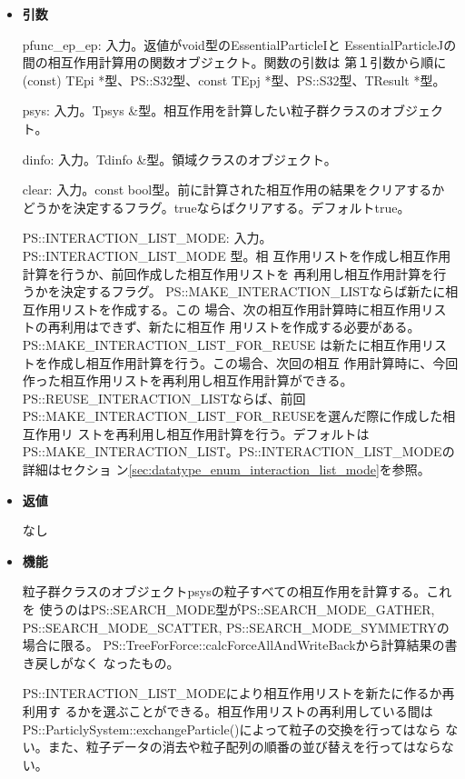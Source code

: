\begin{itemize}

\item {\bf 引数}

pfunc\_ep\_ep: 入力。返値がvoid型のEssentialParticleIと
EssentialParticleJの間の相互作用計算用の関数オブジェクト。関数の引数は
第１引数から順に(const) TEpi *型、PS::S32型、const
TEpj *型、PS::S32型、TResult *型。

psys: 入力。Tpsys \&型。相互作用を計算したい粒子群クラスのオブジェクト。

dinfo: 入力。Tdinfo \&型。領域クラスのオブジェクト。

clear: 入力。const bool型。前に計算された相互作用の結果をクリアするか
どうかを決定するフラグ。trueならばクリアする。デフォルトtrue。

PS::INTERACTION\_LIST\_MODE: 入力。PS::INTERACTION\_LIST\_MODE 型。相
互作用リストを作成し相互作用計算を行うか、前回作成した相互作用リストを
再利用し相互作用計算を行うかを決定するフラグ。
PS::MAKE\_INTERACTION\_LISTならば新たに相互作用リストを作成する。この
場合、次の相互作用計算時に相互作用リストの再利用はできず、新たに相互作
用リストを作成する必要がある。PS::MAKE\_INTERACTION\_LIST\_FOR\_REUSE
は新たに相互作用リストを作成し相互作用計算を行う。この場合、次回の相互
作用計算時に、今回作った相互作用リストを再利用し相互作用計算ができる。
PS::REUSE\_INTERACTION\_LISTならば、前回
PS::MAKE\_INTERACTION\_LIST\_FOR\_REUSEを選んだ際に作成した相互作用リ
ストを再利用し相互作用計算を行う。デフォルトは
PS::MAKE\_INTERACTION\_LIST。PS::INTERACTION\_LIST\_MODEの詳細はセクショ
ン\ref{sec:datatype_enum_interaction_list_mode}を参照。

\item {\bf 返値}

なし

\item {\bf 機能}

粒子群クラスのオブジェクトpsysの粒子すべての相互作用を計算する。これを
使うのはPS::SEARCH\_MODE型がPS::SEARCH\_MODE\_GATHER,
PS::SEARCH\_MODE\_SCATTER, PS::SEARCH\_MODE\_SYMMETRYの場合に限る。
PS::TreeForForce::calcForceAllAndWriteBackから計算結果の書き戻しがなく
なったもの。

PS::INTERACTION\_LIST\_MODEにより相互作用リストを新たに作るか再利用す
るかを選ぶことができる。相互作用リストの再利用している間は
PS::ParticlySystem::exchangeParticle()によって粒子の交換を行ってはなら
ない。また、粒子データの消去や粒子配列の順番の並び替えを行ってはならな
い。

\end{itemize}

